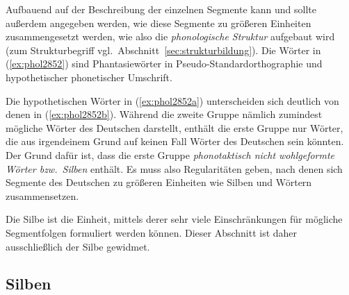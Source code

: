 Aufbauend auf der Beschreibung der einzelnen Segmente kann und sollte außerdem angegeben werden, wie diese Segmente zu größeren Einheiten zusammengesetzt werden, wie also die \textit{phonologische Struktur} aufgebaut wird (zum Strukturbegriff vgl.\ Abschnitt~\ref{sec:strukturbildung}).
Die Wörter in (\ref{ex:phol2852}) sind Phantasiewörter in Pseudo-Standardorthographie und hypothetischer phonetischer Umschrift.

\begin{exe}
  \ex\label{ex:phol2852}
  \begin{xlist}
  \end{xlist}
\end{exe}

Die hypothetischen Wörter in (\ref{ex:phol2852a}) unterscheiden sich deutlich von denen in (\ref{ex:phol2852b}).
Während die zweite Gruppe nämlich zumindest mögliche Wörter des Deutschen darstellt, enthält die erste Gruppe nur Wörter, die aus irgendeinem Grund auf keinen Fall Wörter des Deutschen sein könnten.
Der Grund dafür ist, dass die erste Gruppe \textit{phonotaktisch nicht wohlgeformte Wörter bzw.\ Silben} enthält.
Es muss also Regularitäten geben, nach denen sich Segmente des Deutschen zu größeren Einheiten wie Silben und Wörtern zusammensetzen.


Die Silbe ist die Einheit, mittels derer sehr viele Einschränkungen für mögliche Segmentfolgen formuliert werden können.
Dieser Abschnitt ist daher ausschließlich der Silbe gewidmet.

\subsection{Silben}

\label{sec:silben}


